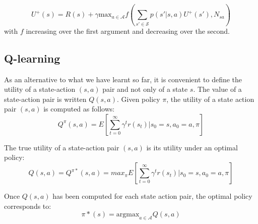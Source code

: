 \begin{equation}
    U^+(s) = R(s) + \gamma \text{max}_{a \in \mathcal{A}} f(\sum_{s' \in \mathcal{S}} p(s' | s,a) U^+(s'), N_{sa})
\end{equation}
with $f$ increasing over the first argument and decreasing over the second.

\subsection{Q-learning}
As an alternative to what we have learnt so far, it is convenient to define the utility of a state-action $(s,a)$ pair and not only of a state $s$. The value of a state-action pair is written $Q(s,a)$. Given policy $\pi$, the utility of a state action pair $(s,a)$ is computed as follows:
\begin{equation}
    Q^{\pi}(s,a) = E[\sum_{t=0}^{\infty} \gamma^t r(s_t) | s_0 = s, a_0 = a, \pi]
\end{equation}

The true utility of a state-action pair $(s,a)$ is its utility under an optimal policy:
\begin{equation}
    Q(s,a) = Q^{\pi*}(s,a) = max_{\pi} E[\sum_{t=0}^{\infty} \gamma^t r(s_t) | s_0 = s, a_0 = a, \pi]
\end{equation}

Once $Q(s,a)$ has been computed for each state action pair, the optimal policy corresponds to:
\begin{equation}
    \pi*(s) = \text{argmax}_{a \in \mathcal{A}} Q(s,a)
\end{equation}

